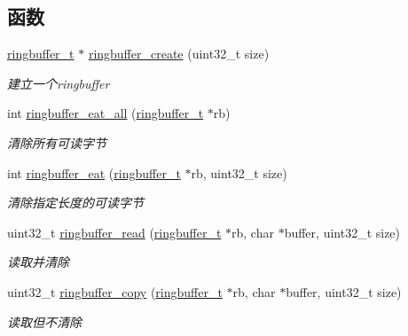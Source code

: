 \subsection*{函数}
\begin{DoxyCompactItemize}
\item 
\hyperlink{a00050_af929c5cf86b6a0f64dde407dfe60482e_af929c5cf86b6a0f64dde407dfe60482e}{ringbuffer\+\_\+t} $\ast$ \hyperlink{a00083_a535c5ed96efcd2415e6cad1cfcf44228_a535c5ed96efcd2415e6cad1cfcf44228}{ringbuffer\+\_\+create} (uint32\+\_\+t size)
\begin{DoxyCompactList}\small\item\em 建立一个ringbuffer \end{DoxyCompactList}\item 
int \hyperlink{a00083_a9af8341a5cc83cc1d6acbb868c498a03_a9af8341a5cc83cc1d6acbb868c498a03}{ringbuffer\+\_\+eat\+\_\+all} (\hyperlink{a00050_af929c5cf86b6a0f64dde407dfe60482e_af929c5cf86b6a0f64dde407dfe60482e}{ringbuffer\+\_\+t} $\ast$rb)
\begin{DoxyCompactList}\small\item\em 清除所有可读字节 \end{DoxyCompactList}\item 
int \hyperlink{a00083_aaab3eabc3d26998d7ec5458e89781b1d_aaab3eabc3d26998d7ec5458e89781b1d}{ringbuffer\+\_\+eat} (\hyperlink{a00050_af929c5cf86b6a0f64dde407dfe60482e_af929c5cf86b6a0f64dde407dfe60482e}{ringbuffer\+\_\+t} $\ast$rb, uint32\+\_\+t size)
\begin{DoxyCompactList}\small\item\em 清除指定长度的可读字节 \end{DoxyCompactList}\item 
uint32\+\_\+t \hyperlink{a00083_a93296c953b97b465aa6d878d7ddaff87_a93296c953b97b465aa6d878d7ddaff87}{ringbuffer\+\_\+read} (\hyperlink{a00050_af929c5cf86b6a0f64dde407dfe60482e_af929c5cf86b6a0f64dde407dfe60482e}{ringbuffer\+\_\+t} $\ast$rb, char $\ast$buffer, uint32\+\_\+t size)
\begin{DoxyCompactList}\small\item\em 读取并清除 \end{DoxyCompactList}\item 
uint32\+\_\+t \hyperlink{a00083_a0b57361c8632557fc144c7f7b853a33e_a0b57361c8632557fc144c7f7b853a33e}{ringbuffer\+\_\+copy} (\hyperlink{a00050_af929c5cf86b6a0f64dde407dfe60482e_af929c5cf86b6a0f64dde407dfe60482e}{ringbuffer\+\_\+t} $\ast$rb, char $\ast$buffer, uint32\+\_\+t size)
\begin{DoxyCompactList}\small\item\em 读取但不清除 \end{DoxyCompactList}\item 

\end{DoxyCompactItemize}
